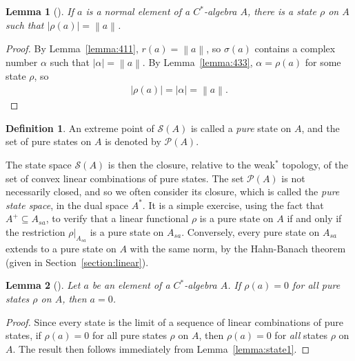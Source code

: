 \documentclass[11pt,a4paper]{report}
\theoremstyle{plain}
\newtheorem{lemma}{Lemma}
\theoremstyle{definition}
\newtheorem{defn}{Definition}
\newcommand{\1}{\mathbbm{1}}
\renewcommand{\S}{\mathscr{S}}
\renewcommand{\P}[1]{\mathscr{P}(#1)}
\newcommand{\spec}[1]{\sigma(#1)}
\begin{document}
\begin{lemma}[{\cite[4.3.4,(iv)]{kadison83}}]\label{lemma:state2}
	If $a$ is a normal element of a $C^\ast$-algebra $A$, there is a state $\rho$ 
	on $A$ such that $|\rho(a)|=\left\|a\right\|$.
\end{lemma}
\begin{proof}
	By Lemma~\ref{lemma:411}, $r(a)=\left\|a\right\|$, so $\spec a$ contains a 
	complex number $\alpha$ such that $|\alpha|=\left\|a\right\|$. By 
	Lemma~\ref{lemma:433}, $\alpha=\rho(a)$ for some state $\rho$, so 
	\begin{align*}
		|\rho(a)|=|\alpha|=\left\|a\right\|.
	\end{align*}
\end{proof}

\begin{defn}
	An extreme point of $\S(A)$ is called a \emph{pure} state on $A$, and the set 
	of pure states on $A$ is denoted by $\P{A}$.
\end{defn}
The state space $\S(A)$ is then the closure, relative to the weak$^\ast$ 
topology, of the set of convex linear combinations of pure states.
The set $\P A$ is not necessarily closed, and so we often consider its closure, 
which is called the \emph{pure state space}, in the dual space $A^\ast$.
It is a simple exercise, using the fact that $A^+\subseteq A_{sa}$, to verify 
that a linear functional $\rho$ is a pure state on $A$ if and only if the 
restriction $\rho|_{A_{sa}}$ is a pure state on $A_{sa}$.
Conversely, every pure state on $A_{sa}$ extends to a pure state on $A$ with the 
same norm, by the Hahn-Banach theorem (given in Section~\ref{section:linear}).
 

\begin{lemma}[{\cite[4.3.8,(i)]{kadison83}}]\label{lemma:pure1}
	Let $a$ be an element of a $C^\ast$-algebra $A$. If $\rho(a)=0$ for all 
	\emph{pure} states $\rho$ on $A$, then $a=0$.
\end{lemma}
\begin{proof}
	Since every state is the limit of a sequence of linear combinations of pure 
	states, if $\rho(a)=0$ for all pure states $\rho$ on $A$, then $\rho(a)=0$ for 
	\emph{all} states $\rho$ on $A$. The result then follows immediately from 
	Lemma~\ref{lemma:state1}.
\end{proof}
\end{document}
